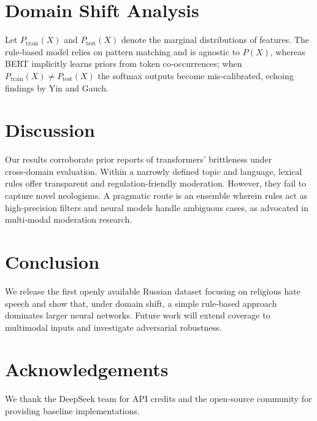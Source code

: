 \documentclass{article}
\begin{document}
\section{Domain Shift Analysis}
Let $P_{\text{train}}(X)$ and $P_{\text{test}}(X)$ denote the marginal distributions of features. The rule‑based model relies on pattern matching and is agnostic to $P(X)$, whereas BERT implicitly learns priors from token co‑occurrences; when $P_{\text{train}}(X)\neq P_{\text{test}}(X)$ the softmax outputs become mis‑calibrated, echoing findings by Yin and Gauch\cite{yinn2023emotion}.

\section{Discussion}
Our results corroborate prior reports of transformers' brittleness under cross‑domain evaluation\cite{nasir2023cross}. Within a narrowly defined topic and language, lexical rules offer transparent and regulation‑friendly moderation. However, they fail to capture novel neologisms. A pragmatic route is an ensemble wherein rules act as high‑precision filters and neural models handle ambiguous cases, as advocated in multi‑modal moderation research\cite{mhsdf2025}.

\section{Conclusion}
We release the first openly available Russian dataset focusing on religious hate speech and show that, under domain shift, a simple rule‑based approach dominates larger neural networks. Future work will extend coverage to multimodal inputs and investigate adversarial robustness.

\section*{Acknowledgements}
We thank the DeepSeek team for API credits and the open‑source community for providing baseline implementations.
\end{document}
